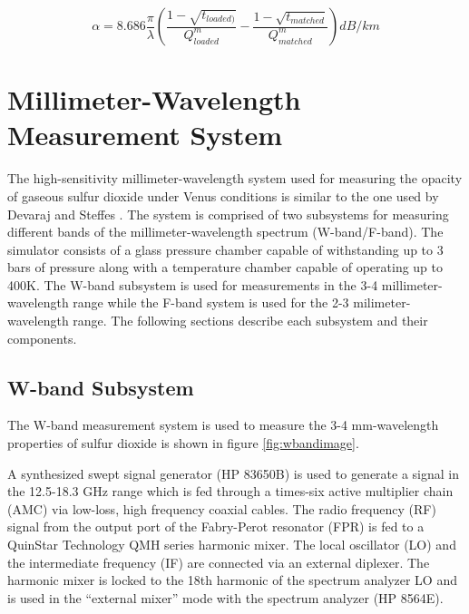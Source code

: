 \begin{equation} \label{eq:alphamatch}
\alpha = 8.686 \frac{\pi}{\lambda}\left(\frac{1 - \sqrt{t_{loaded)}}}{Q^m_{loaded}} - \frac{1-\sqrt{t_{matched}}}{Q_{matched}^m} \right) dB/km
\end{equation}

\section{Millimeter-Wavelength Measurement System}

The high-sensitivity millimeter-wavelength system used for measuring the opacity of gaseous sulfur dioxide under Venus conditions is similar to the one used by Devaraj and Steffes \cite{Devaraj-2011} \cite{Devaraj-thesis}. The system is comprised of two subsystems for measuring different bands of the millimeter-wavelength spectrum (W-band/F-band). The simulator consists of a glass pressure chamber capable of withstanding up to 3 bars of pressure along with a temperature chamber capable of operating up to 400K. The W-band subsystem is used for measurements in the 3-4 millimeter-wavelength range while the F-band system is used for the 2-3 milimeter-wavelength range. The following sections describe each subsystem and their components. 

\subsection{W-band Subsystem}

The W-band measurement system is used to measure the 3-4 mm-wavelength properties of sulfur dioxide is shown in figure \ref{fig:wbandimage}.

A synthesized swept signal generator (HP 83650B) is used to generate a signal in the 12.5-18.3 GHz range which is fed through a times-six active multiplier chain (AMC) via low-loss, high frequency coaxial cables. The radio frequency (RF) signal from the output port of the Fabry-Perot resonator (FPR) is fed to a QuinStar Technology QMH series harmonic mixer. The local oscillator (LO) and the intermediate frequency (IF) are connected via an external diplexer. The harmonic mixer is locked to the 18th harmonic of the spectrum analyzer LO and is used in the ``external mixer'' mode with the spectrum analyzer (HP 8564E). 

